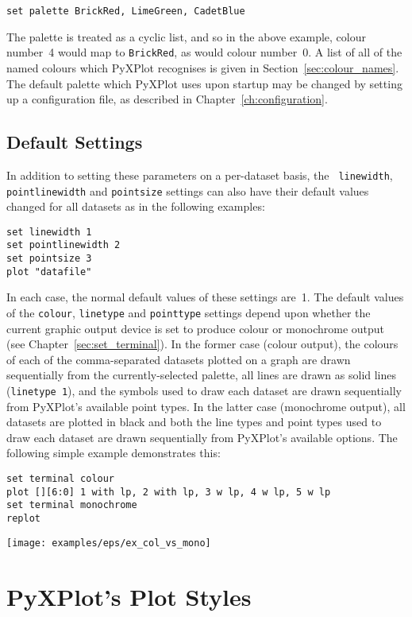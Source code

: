 \begin{verbatim}
set palette BrickRed, LimeGreen, CadetBlue
\end{verbatim}

\noindent The palette is treated as a cyclic list, and so in the above example,
colour number~4 would map to {\tt BrickRed}, as would colour number~0. A list
of all of the named colours which PyXPlot recognises is given in
Section~\ref{sec:colour_names}. The default palette which PyXPlot uses upon
startup may be changed by setting up a configuration file, as described in
Chapter~\ref{ch:configuration}.

\subsection{Default Settings}

In addition to setting these parameters on a per-dataset basis, the {\tt
linewidth}, {\tt pointlinewidth} and {\tt pointsize} settings can also have
their default values changed for all datasets as in the following examples:
\begin{verbatim}
set linewidth 1
set pointlinewidth 2
set pointsize 3
plot "datafile"
\end{verbatim}
In each case, the normal default values of these settings are~1. The default
values of the {\tt colour}, {\tt linetype} and {\tt pointtype} settings depend
upon whether the current graphic output device is set to produce colour or
monochrome output (see Chapter~\ref{sec:set_terminal}). In the former case
(colour output), the colours of each of the comma-separated datasets plotted on
a graph are drawn sequentially from the currently-selected palette, all lines
are drawn as solid lines ({\tt line\-type~1}), and the symbols used to draw
each dataset are drawn sequentially from PyXPlot's available point types. In
the latter case (monochrome output), all datasets are plotted in black and
both the line types and point types used to draw each dataset are drawn
sequentially from PyXPlot's available options. The following simple example
demonstrates this:
\begin{verbatim}
set terminal colour
plot [][6:0] 1 with lp, 2 with lp, 3 w lp, 4 w lp, 5 w lp
set terminal monochrome
replot
\end{verbatim}
\centerline{\texttt{[image: examples/eps/ex\_col\_vs\_mono]}}

\section{PyXPlot's Plot Styles}
\label{sec:list_of_plotstyles}


